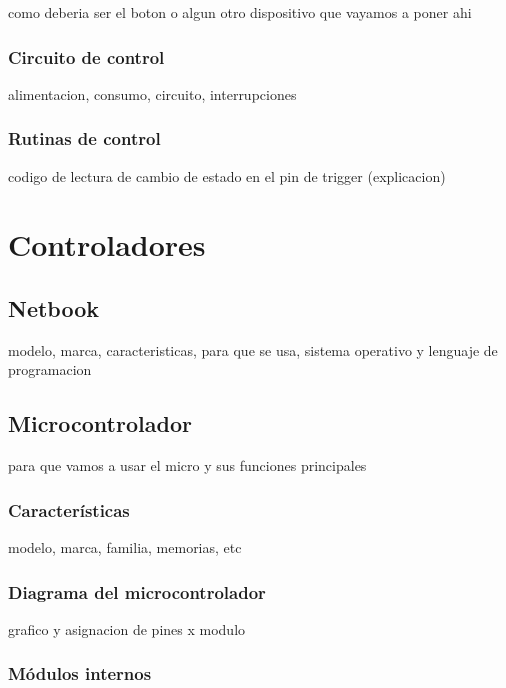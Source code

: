 como deberia ser el boton o algun otro dispositivo que vayamos a poner ahi

\subsubsection{Circuito de control}
\label{h_sensado_pulsador_circuito}

alimentacion, consumo, circuito, interrupciones

\subsubsection{Rutinas de control}
\label{h_sensado_pulsador_rutinas}

codigo de lectura de cambio de estado en el pin de trigger (explicacion)

\section{Controladores}
\label{h_controlador}

\subsection{Netbook}
\label{h_controlador_netbook}

modelo, marca, caracteristicas, para que se usa, sistema operativo y lenguaje de programacion

\subsection{Microcontrolador}
\label{h_controlador_micro}

para que vamos a usar el micro y sus funciones principales

\subsubsection{Caracter\'isticas}
\label{h_controlador_micro_caracteristicas}

modelo, marca, familia, memorias, etc

\subsubsection{Diagrama del microcontrolador}
\label{h_controlador_micro_diagrama}

grafico y asignacion de pines x modulo

\subsubsection{M\'odulos internos}
\label{h_controlador_micro_modulos}

